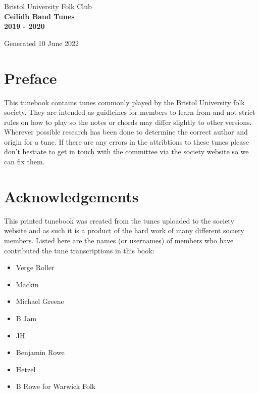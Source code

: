 \documentclass[12pt,a4paper,twoside]{article}
\makeatletter
\newcommand{\thetitle}{Ceilidh Band Tunes \\ \vspace{0.65cm} 2019 - 2020}
\newcommand{\thedate}{10 June 2022}
\renewcommand\tableofcontents{%
    \begin{multicols}{2}[
      \centering
      \section*{\large\contentsname
        \@mkboth{%
           \MakeUppercase\contentsname}{\MakeUppercase\contentsname}}]
    \@starttoc{toc}%
    \end{multicols}
}
\makeatother
\begin{document}
\begin{titlepage}
   \begin{center}
       \large Bristol University Folk Club \\

       \vspace{4cm}
       \textbf{\Huge \thetitle}

       \vspace{0.5cm}
       Generated \thedate

       \vspace{1.5cm}

       \vfill

   \end{center}
\end{titlepage}

\tableofcontents

\section{Preface}

This tunebook contains tunes commonly played by the Bristol University folk society. They are intended as guidleines for members to learn from and not strict rules on how to play so the notes or chords may differ slightly to other versions.
Wherever possible research has been done to determine the correct author and origin for a tune. If there are any errors in the attribtions to these tunes please don't hestiate to get in touch with the committee via the society website so we can fix them.

\section{Acknowledgements}

This printed tunebook was created from the tunes uploaded to the society website and as such it is a product of the hard work of many different society members. Listed here are the names (or usernames) of members who have contributed the tune transcriptions in this book:

\begin{multicols}{2}
\begin{itemize}\item Verge Roller
\item Mackin
\item Michael Greene
\item B Jam
\item JH
\item Benjamin Rowe
\item Hetzel
\item B Rowe for Warwick Folk
\end{itemize}

\end{multicols}
\end{document}
